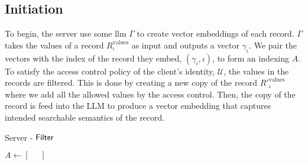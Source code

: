 \subsection*{\thesubsection\quad Initiation}\label{subsec:SemanticSearchInitiation}


To begin, the server use some \acrshort{llm} $ \Gamma $ to create vector embeddings of each record. $ \Gamma $ takes the values of a record $ R^{\mathrm{values}}_{\iota} $ as input and outputs a vector $ \gamma_{\iota} $. We pair the vectors with the index of the record they embed, $ \left(\gamma_{\iota}, \iota \right) $, to form an indexing $ A $. To satisfy the access control policy of the client's identity, $ \mathcal{U} $, the values in the records are filtered. This is done by creating a new copy of the record $ {R'}^{\mathrm{values}}_{\iota} $ where we add all the allowed values by the access control. Then, the copy of the record is feed into the LLM to produce a vector embedding that captures intended searchable semantics of the record.

\begin{algorithm} [H]
    \LinesNumbered
    \caption{Server - $ \mathsf{{Filter}} $}
    \label{algo:SemanticFilter}

    \vspace*{0.48cm}

    $ A \gets \left[ \phantom{=}\right] $


    \vspace*{0.48cm}

\end{algorithm}
